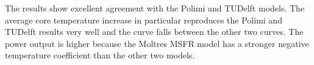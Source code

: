 The results show excellent agreement with the Polimi and TUDelft models. The
average core temperature increase in particular reproduces the Polimi and   
TUDelft results very well and the curve falls between the other two curves.
The power output is higher because the Moltres \gls{MSFR} model has a
stronger negative temperature coefficient than the other two models. 
